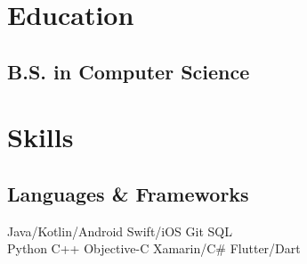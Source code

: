 \documentclass[]{Resume}
\begin{document}
%
%
\lastupdated

%
%

%
%

\begin{minipage}[t]{0.33\textwidth} 


\section{Education} 

\subsection{B.S. in Computer Science}
\sectionsep

\section{Skills}
\subsection{Languages \& Frameworks}
Java/Kotlin/Android \textbullet{} Swift/iOS
Git \textbullet{} SQL\\
Python \textbullet{} C++ \textbullet{} Objective-C \textbullet{} 
Xamarin/C\# \textbullet{} Flutter/Dart
\sectionsep


\end{minipage}
\end{document}
